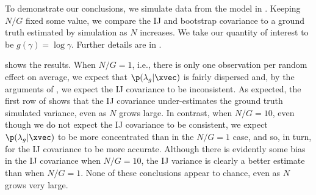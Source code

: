 To demonstrate our conclusions, we simulate data from the model in
.  Keeping $N / G$ fixed some value, we compare the IJ
and bootstrap covariance to a ground truth estimated by simulation as $N$ increases.  
We take our quantity of interest to be $g(\gamma) = \log \gamma$.  Further
details are in .

\PoissonREGraph{}

 shows the results.  When $N/G = 1$, i.e., there is
only one observation per random effect on average, we expect that $\p(\lambda_g
\vert \xvec)$ is fairly dispersed and, by the arguments of
, we expect the IJ covariance to be inconsistent.
As expected, the first row of  shows that the IJ
covariance under-estimates the ground truth simulated variance, even as
$N$ grows large.  In contrast, when $N/G = 10$, even though we do not expect
the IJ covariance to be consistent, we expect $\p(\lambda_g
\vert \xvec)$ to be more concentrated than in the $N/G=1$ case, and so,
in turn, for the IJ covariance to be more accurate.  Although there is
evidently some bias in the IJ covariance when $N/G=10$, the IJ variance is
clearly a better estimate than when $N/G=1$.  None of these conclusions
appear to chance, even as $N$ grows very large.

